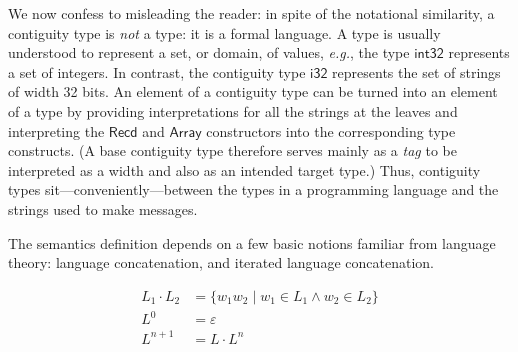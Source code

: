 \documentclass[a4paper,UKenglish,cleveref, autoref, thm-restate]{lipics-v2021}
\newcommand{\eg}{\textit{e.g.}}
\newcommand{\konst}[1]{\ensuremath{\mathsf{#1}}}
\newcommand{\set}[1]{\ensuremath{\{ {#1} \}}}
\begin{document}
 We now confess to misleading the reader: in spite of the notational
 similarity, a contiguity type is \emph{not} a type: it is a formal
 language. A type is usually understood to represent a set, or domain,
 of values, \eg, the type \konst{int32} represents a set of
 integers. In contrast, the contiguity type \konst{i32} represents the
 set of strings of width 32 bits. An element of a contiguity type can
 be turned into an element of a type by providing interpretations for
 all the strings at the leaves and interpreting the \konst{Recd} and
 \konst{Array} constructors into the corresponding type constructs. (A
 base contiguity type therefore serves mainly as a \emph{tag} to be
 interpreted as a width and also as an intended target type.) Thus,
 contiguity types sit---conveniently---between the types in a
 programming language and the strings used to make messages.

The semantics definition depends on a few basic notions familiar from
language theory: language concatenation, and iterated language
concatenation.

\begin{align*}
L_1 \cdot L_2 &= \set{w_1 w_2 \mid w_1 \in L_1 \land w_2 \in  L_2} \\
L^0 &= \varepsilon \\
L^{n+1} &= L \cdot L^n
\end{align*}
\end{document}
